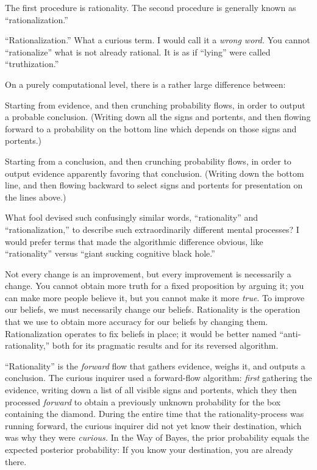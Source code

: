 {
 The first procedure is rationality. The second procedure is
generally known as
``rationalization.''}

{
 ``Rationalization.'' What a
curious term. I would call it a \textit{wrong word.} You cannot
``rationalize'' what is not already
rational. It is as if ``lying'' were
called ``truthization.''}

{
 On a purely computational level, there is a rather large
difference between:}

{
 Starting from evidence, and then crunching probability flows, in
order to output a probable conclusion. (Writing down all the signs and
portents, and then flowing forward to a probability on the bottom line
which depends on those signs and portents.)}

{
 Starting from a conclusion, and then crunching probability flows,
in order to output evidence apparently favoring that conclusion.
(Writing down the bottom line, and then flowing backward to select
signs and portents for presentation on the lines above.)}

{
 What fool devised such confusingly similar words,
``rationality'' and
``rationalization,'' to describe
such extraordinarily different mental processes? I would prefer terms
that made the algorithmic difference obvious, like
``rationality'' versus
``giant sucking cognitive black
hole.''}

{
 Not every change is an improvement, but every improvement is
necessarily a change. You cannot obtain more truth for a fixed
proposition by arguing it; you can make more people believe it, but you
cannot make it more \textit{true}. To improve our beliefs, we must
necessarily change our beliefs. Rationality is the operation that we
use to obtain more accuracy for our beliefs by changing them.
Rationalization operates to fix beliefs in place; it would be better
named ``anti-rationality,'' both for
its pragmatic results and for its reversed algorithm.}

{
 ``Rationality'' is the
\textit{forward} flow that gathers evidence, weighs it, and outputs a
conclusion. The curious inquirer used a forward-flow algorithm:
\textit{first} gathering the evidence, writing down a list of all
visible signs and portents, which they then processed \textit{forward}
to obtain a previously unknown probability for the box containing the
diamond. During the entire time that the rationality-process was
running forward, the curious inquirer did not yet know their
destination, which was why they were \textit{curious.} In the Way of
Bayes, the prior probability equals the expected posterior probability:
If you know your destination, you are already there.}

